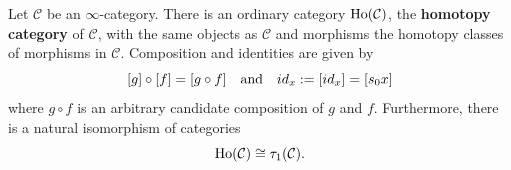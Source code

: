 \begin{proposition}
     Let \(\mathcal{C}\) be an \(\infty\)-category. There is an ordinary category \(\text{Ho}(\mathcal{C})\), the \textbf{homotopy category} of \(\mathcal{C}\), with the same objects as \(\mathcal{C}\) and morphisms the homotopy classes of morphisms in \(\mathcal{C}\). Composition and identities are given by 
     \[[g]\circ[f]=[g\circ f]\ \ \ \t{and}\ \ \ id_x:=[id_x]=[s_0x]\]
     where \(g\circ f\) is an arbitrary candidate composition of \(g\) and \(f\). Furthermore, there is a natural isomorphism of categories
     \[\text{Ho}(\mathcal{C})\cong \tau_1(\mathcal{C}).\]
\end{proposition}